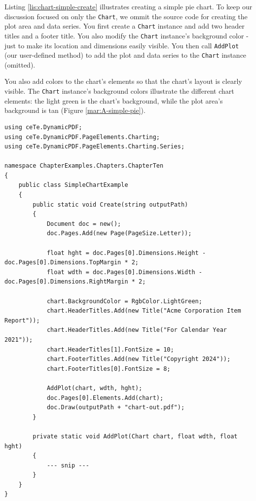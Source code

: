 \documentclass[american,letterpaper]{tufte-book}
\numberwithin{equation}{section}
\numberwithin{figure}{section}
\begin{document}
{\begin{marginfigure}
\end{marginfigure}

Listing \ref{lis:chart-simple-create} illustrates creating a simple
pie chart. To keep our discussion focused on only the \texttt{Chart},
we ommit the source code for creating the plot area and data series.
You first create a \texttt{Chart} instance and add two header titles
and a footer title. You also modify the \texttt{Chart} instance's
background color - just to make its location and dimensions easily
visible. You then call \texttt{AddPlot} (our user-defined method) to
add the plot and data series to the \texttt{Chart} instance (omitted). 

You also add colors to the chart's elements so that the chart's layout
is clearly visible. The \texttt{Chart} instance's background colors
illustrate the different chart elements: the light green is the chart's
background, while the plot area's background is tan (Figure \ref{mar:A-simple-pie}).

\bgroup{}
\begin{lstlisting}[caption={Creating a simple chart.},label={lis:chart-simple-create},basicstyle={\small\ttfamily},breaklines=true]
using ceTe.DynamicPDF;
using ceTe.DynamicPDF.PageElements.Charting;
using ceTe.DynamicPDF.PageElements.Charting.Series;

namespace ChapterExamples.Chapters.ChapterTen
{
    public class SimpleChartExample
    {
        public static void Create(string outputPath)
        {
            Document doc = new();
            doc.Pages.Add(new Page(PageSize.Letter));

            float hght = doc.Pages[0].Dimensions.Height - doc.Pages[0].Dimensions.TopMargin * 2;
            float wdth = doc.Pages[0].Dimensions.Width - doc.Pages[0].Dimensions.RightMargin * 2;
 
            chart.BackgroundColor = RgbColor.LightGreen;
            chart.HeaderTitles.Add(new Title("Acme Corporation Item Report"));
            chart.HeaderTitles.Add(new Title("For Calendar Year 2021"));
            chart.HeaderTitles[1].FontSize = 10;
            chart.FooterTitles.Add(new Title("Copyright 2024"));
            chart.FooterTitles[0].FontSize = 8;

            AddPlot(chart, wdth, hght);
            doc.Pages[0].Elements.Add(chart);
            doc.Draw(outputPath + "chart-out.pdf");
        }

        private static void AddPlot(Chart chart, float wdth, float hght)
        {
            --- snip ---
        }
    }
}
\end{lstlisting}
\leavevmode\egroup

}
\end{document}
